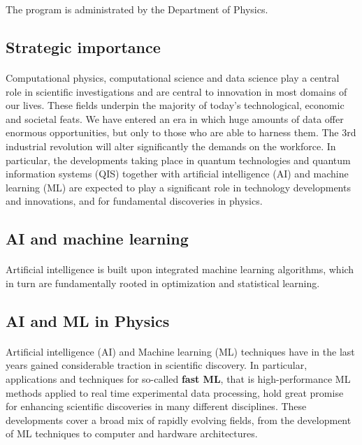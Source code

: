 \documentclass[%
oneside,                 %
final,                   %
10pt]{article}
\begin{document}
\noindent
The program is  administrated by the Department of Physics.



\subsection{Strategic importance}


\paragraph{}
Computational physics, computational science and data science play a
central role in scientific investigations and are central to
innovation in most domains of our lives. These fields underpin the
majority of today's technological, economic and societal feats. We
have entered an era in which huge amounts of data offer enormous
opportunities, but only to those who are able to harness them. The 3rd
industrial revolution will alter significantly the demands on the
workforce. In particular, the developments taking place in quantum
technologies and quantum information systems (QIS) together with
artificial intelligence (AI) and machine learning (ML) are expected to
play a significant role in technology developments and innovations,
and for fundamental discoveries in physics.



\subsection{AI and machine learning}


\paragraph{}
Artificial
intelligence is built upon integrated machine learning algorithms,
which in turn are fundamentally rooted in optimization and statistical
learning.



\subsection{AI and ML in Physics}


\paragraph{}
Artificial intelligence (AI) and Machine learning (ML)  techniques
have in the last years gained considerable traction in
scientific discovery. In particular, applications and techniques for
so-called \textbf{fast ML}, that is high-performance ML methods applied
to real time experimental data processing, hold great promise for
enhancing scientific discoveries in many different disciplines.
These developments cover a broad mix of rapidly
evolving fields, from the development of ML techniques to computer and
hardware architectures.
\end{document}
